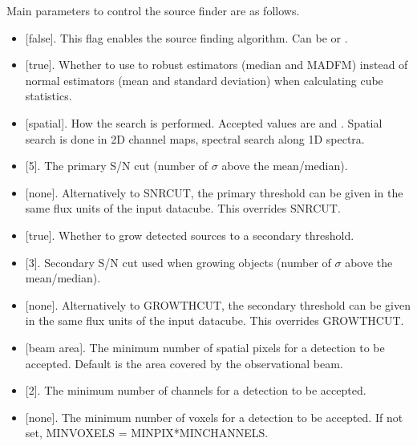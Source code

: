 \documentclass[letterpaper,10pt,english]{sphinxmanual}
\begin{document}
Main parameters to control the source finder are as follows.
\begin{itemize}
\item {} 
 {[}false{]}. This flag enables the source finding algorithm. Can be  or .

\item {} 
 {[}true{]}. Whether to use to robust estimators (median and MADFM) instead of normal estimators (mean and standard deviation) when calculating cube statistics.

\item {} 
 {[}spatial{]}. How the search is performed. Accepted values are  and . Spatial search is done in 2D channel maps, spectral search along 1D spectra.

\item {} 
 {[}5{]}. The primary S/N cut (number of \(\sigma\) above the mean/median).

\item {} 
 {[}none{]}. Alternatively to SNRCUT, the primary threshold can be given in the same flux units of the input datacube. This overrides SNRCUT.

\item {} 
 {[}true{]}. Whether to grow detected sources to a secondary threshold.

\item {} 
 {[}3{]}. Secondary S/N cut used when growing objects (number of \(\sigma\) above the mean/median).

\item {} 
 {[}none{]}. Alternatively to GROWTHCUT, the secondary threshold can be given in the same flux units of the input datacube. This overrides GROWTHCUT.

\item {} 
 {[}beam area{]}. The minimum number of spatial pixels for a detection to be accepted. Default is the area covered by the observational beam.

\item {} 
 {[}2{]}. The minimum number of channels for a detection to be accepted.

\item {} 
 {[}none{]}.  The minimum number of voxels for a detection to be accepted. If not set, MINVOXELS = MINPIX*MINCHANNELS.


\end{itemize}
\end{document}

